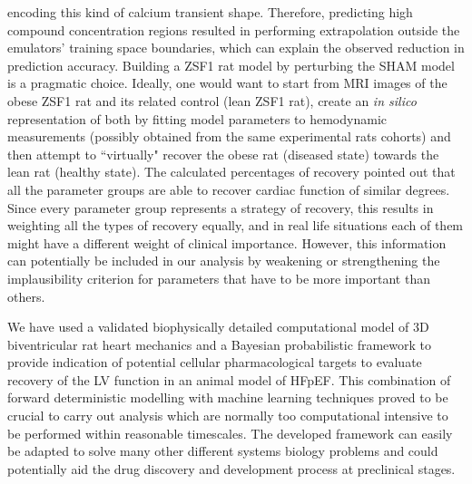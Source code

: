encoding this kind of calcium transient shape. Therefore, predicting high compound concentration regions resulted in performing extrapolation outside the emulators' training space boundaries, which can explain the observed reduction in prediction accuracy. Building a ZSF1 rat model by perturbing the SHAM model is a pragmatic choice. Ideally, one would want to start from MRI images of the obese ZSF1 rat and its related control (lean ZSF1 rat), create an \textit{in silico} representation of both by fitting model parameters to hemodynamic measurements (possibly obtained from the same experimental rats cohorts) and then attempt to ``virtually" recover the obese rat (diseased state) towards the lean rat (healthy state). The calculated percentages of recovery pointed out that all the parameter groups are able to recover cardiac function of similar degrees. Since every parameter group represents a strategy of recovery, this results in weighting all the types of recovery equally, and in real life situations each of them might have a different weight of clinical importance. However, this information can potentially be included in our analysis by weakening or strengthening the implausibility criterion for parameters that have to be more important than others.

\vspace{0.2cm}\noindent
{}

\noindent
We have used a validated biophysically detailed computational model of $3$D biventricular rat heart mechanics and a Bayesian probabilistic framework to provide indication of potential cellular pharmacological targets to evaluate recovery of the LV function in an animal model of HFpEF. This combination of forward deterministic modelling with machine learning techniques proved to be crucial to carry out analysis which are normally too computational intensive to be performed within reasonable timescales. The developed framework can easily be adapted to solve many other different systems biology problems and could potentially aid the drug discovery and development process at preclinical stages.